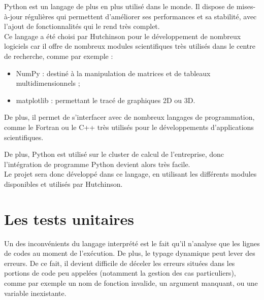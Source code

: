Python est un langage de plus en plus utilisé dans le monde.
Il dispose de mises-à-jour régulières qui permettent d'améliorer ses performances et sa stabilité, avec l'ajout de fonctionnalités qui le rend très complet.
\\


Ce langage a été choisi par Hutchinson pour le développement de nombreux logiciels car il offre de nombreux modules scientifiques très utilisés dans le centre de recherche, comme par exemple :
\begin{itemize}
	\item NumPy : destiné à la manipulation de matrices et de tableaux multidimensionnels ;
	\item matplotlib : permettant le tracé de graphiques 2D ou 3D.
\end{itemize}
De plus, il permet de s'interfacer avec de nombreux langages de programmation, comme le Fortran ou le C++ très utilisés pour le développements d'applications scientifiques.

De plus, Python est utilisé sur le cluster de calcul de l'entreprise, donc l'intégration de programme Python devient alors très facile.
\\


Le projet sera donc développé dans ce langage, en utilisant les différents modules disponibles et utilisés par Hutchinson.
\\






\section{Les tests unitaires}

Un des inconvénients du langage interprété est le fait qu'il n'analyse que les lignes de codes au moment de l'exécution.
De plus, le typage dynamique peut lever des erreurs.
De ce fait, il devient difficile de déceler les erreurs situées dans les portions de code peu appelées (notamment la gestion des cas particuliers), comme par exemple un nom de fonction invalide, un argument manquant, ou une variable inexistante.
\\


